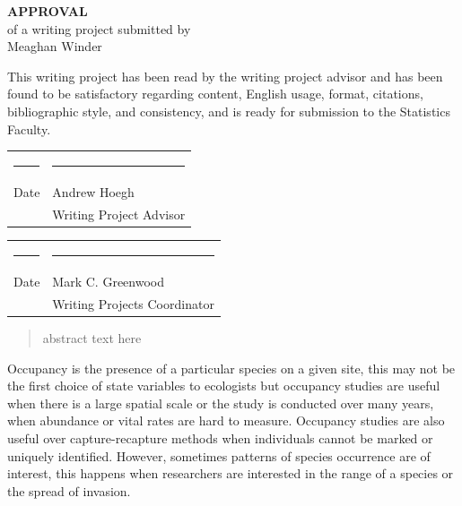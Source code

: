 \documentclass[12pt]{article}\usepackage[]{graphicx}\usepackage[]{color}
\begin{document}
\begin{titlepage}
\null
\begin{center}
{\bf\huge APPROVAL}\\[1.0 in]
of a writing project submitted by\\[.25 in]
Meaghan Winder \\[0.5 in]
\end{center}

\noindent
This writing project has been read by the writing project advisor and
has been found to be satisfactory regarding content, English usage,
format, citations, bibliographic style, and consistency, and is ready
for submission to the Statistics Faculty.

\vspace{.3in}
\begin{center}
\begin{tabular}{ll}
\rule{2.75in}{.03in} & \rule{2.75in}{.03in} \\
Date& Andrew Hoegh \\
& Writing Project Advisor \\
\end{tabular}
\end{center}

\vspace{1cm}

\begin{center}
\begin{tabular}{ll}
\rule{2.75in}{.03in} & \rule{2.75in}{.03in} \\
Date& Mark C. Greenwood \\
& Writing Projects Coordinator \\
\end{tabular}
\end{center}

\end{titlepage}

\newpage
\tableofcontents
\newpage

\begin{abstract}
\noindent abstract text here 
\end{abstract}

\doublespacing



Occupancy is the presence of a particular species on a given site, this may not be the first choice of state variables to ecologists but occupancy studies are useful when there is a large spatial scale or the study is conducted over many years, when abundance or vital rates are hard to measure. Occupancy studies are also useful over capture-recapture methods when individuals cannot be marked or uniquely identified. However, sometimes patterns of species occurrence are of interest, this happens when researchers are interested in the range of a species or the spread of invasion. 
\end{document}
